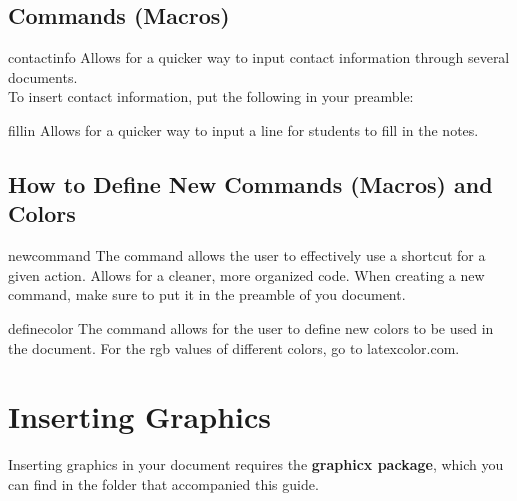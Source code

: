 	\subsection{Commands (Macros)}
		\begin{docCommand}{contactinfo}{}
				Allows for a quicker way to input contact information through several documents.\\ 
				To insert contact information, put the following in your preamble:\\ 
		\end{docCommand}
		\begin{docCommand}{fillin}{}
			Allows for a quicker way to input a line for students to fill in the notes.
		\end{docCommand}
	\subsection{How to Define New Commands (Macros) and Colors}
		\begin{docCommand}{newcommand}{}
			The command  allows the user to effectively use a shortcut for a given action. Allows for a cleaner, more organized code. When creating a new command, make sure to put it in the preamble of you document.  
		\end{docCommand}
		\begin{docCommand}{definecolor}{}
			The  command allows for the user to define new colors to be used in the document. For the rgb values of different colors, go to latexcolor.com.
		\end{docCommand}
\newpage
\section{Inserting Graphics}
\vspace{10.5cm}
	Inserting graphics in your document requires the  \textbf{graphicx package}, which you can find in the folder that accompanied this guide.
